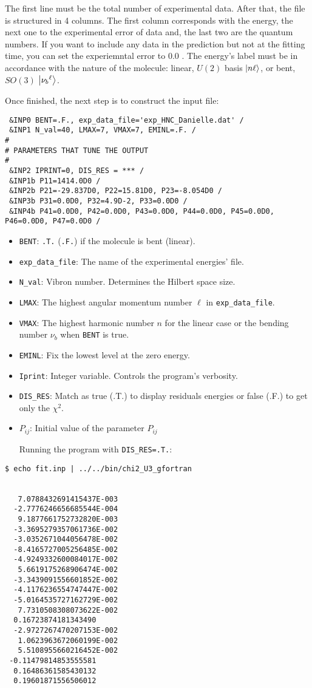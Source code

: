 \documentclass[a4paper,12pt,captions=tableheading]{article}
\begin{document}
The first line must be the total number of experimental data. After that, the file is structured in 4 columns. The first column corresponds with the energy, the next one to the experimental error of data and, the last two are the quantum numbers. If you want to include any data in the prediction but not at the fitting time, you can set the experiemntal error to 0.0 . The energy's label must be in accordance with the nature of the molecule: linear, \(U(2)\) basis \(\ket{n\ell}\), or bent, \(SO(3)\) \(\ket{{\nu_b}^{\ell}}\).

Once finished, the next step is to construct the input file:

\begin{verbatim}
 &INP0 BENT=.F., exp_data_file='exp_HNC_Danielle.dat' / 
 &INP1 N_val=40, LMAX=7, VMAX=7, EMINL=.F. /
#
# PARAMETERS THAT TUNE THE OUTPUT
#
 &INP2 IPRINT=0, DIS_RES = *** /
 &INP1b P11=1414.0D0 /
 &INP2b P21=-29.837D0, P22=15.81D0, P23=-8.054D0 /
 &INP3b P31=0.0D0, P32=4.9D-2, P33=0.0D0 /
 &INP4b P41=0.0D0, P42=0.0D0, P43=0.0D0, P44=0.0D0, P45=0.0D0, P46=0.0D0, P47=0.0D0 /
\end{verbatim}

\begin{itemize}
\item \verb~BENT~: \verb~.T.~ (\verb~.F.~) if the molecule is bent (linear).
\item \verb~exp_data_file~: The name of the experimental energies' file.
\item \verb~N_val~: Vibron number. Determines the Hilbert space size.
\item \verb~LMAX~: The highest angular momentum number \(\ell\) in \verb~exp_data_file~.
\item \verb~VMAX~: The highest harmonic number \(n\) for the linear case or the bending number \(\nu_b\) when \verb~BENT~ is true.
\item \verb~EMINL~: Fix the lowest level at the zero energy.
\item \verb~Iprint~: Integer variable. Controls the program's verbosity.
\item \verb~DIS_RES~: Match as true (.T.) to display residuals energies or false (.F.) to get only the \(\chi^2\).
\item \(P_{ij}\): Initial value of the parameter \(P_{ij}\)

Running the program with \verb~DIS_RES=.T.~:
\end{itemize}

\begin{verbatim}
$ echo fit.inp | ../../bin/chi2_U3_gfortran 


   7.0788432691415437E-003
  -2.7776246656685544E-004
   9.1877661752732820E-003
  -3.3695279357061736E-002
  -3.0352671044056478E-002
  -8.4165727005256485E-002
  -4.9249332600084017E-002
   5.6619175268906474E-002
  -3.3439091556601852E-002
  -4.1176236554747447E-002
  -5.0164535727162729E-002
   7.7310508308073622E-002
  0.16723874181343490     
  -2.9727267470207153E-002
   1.0623963672060199E-002
   5.5108955660216452E-002
 -0.11479814853555581     
  0.16486361585430132     
  0.19601871556506012
\end{verbatim}
\end{document}
